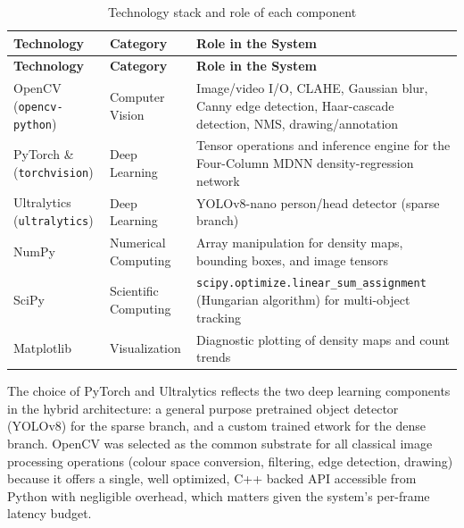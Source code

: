 \begin{longtable}{|>{\raggedright\arraybackslash}p{2.8cm}|>{\raggedright\arraybackslash}p{2.4cm}|>{\raggedright\arraybackslash}p{8.9cm}|}
\caption{Technology stack and role of each component}
\label{tab:techstack}\\
\hline
\textbf{Technology} & \textbf{Category} & \textbf{Role in the System} \\
\hline
\endfirsthead

\hline
\textbf{Technology} & \textbf{Category} & \textbf{Role in the System} \\
\hline
\endhead

OpenCV (\texttt{opencv-}\allowbreak\texttt{python}) &
Computer Vision &
Image/video I/O, CLAHE, Gaussian blur, Canny edge detection,
Haar-cascade detection, NMS, drawing/annotation \\
\hline
PyTorch \& (\texttt{torchvision}) & Deep Learning & Tensor operations and inference engine for the Four-Column MDNN density-regression network \\
\hline
Ultralytics (\texttt{ultralytics}) & Deep Learning & YOLOv8-nano person/head detector (sparse branch) \\
\hline
NumPy & Numerical Computing & Array manipulation for density maps, bounding boxes, and image tensors \\
\hline
SciPy & Scientific Computing & \texttt{scipy.\allowbreak optimize.\allowbreak linear\_\allowbreak sum\_\allowbreak assignment} (Hungarian algorithm) for multi-object tracking \\
\hline
Matplotlib & Visualization & Diagnostic plotting of density maps and count trends \\
\hline

\end{longtable}

The choice of PyTorch and Ultralytics reflects the two deep learning components in the hybrid architecture: a general purpose pretrained object detector (YOLOv8) for the sparse branch, and a custom trained etwork for the dense branch. OpenCV was selected as the common substrate for all classical image processing operations (colour space conversion, filtering, edge detection, drawing) because it offers a single, well optimized, C++ backed API accessible from Python with negligible overhead, which matters given the system's per-frame latency budget.

